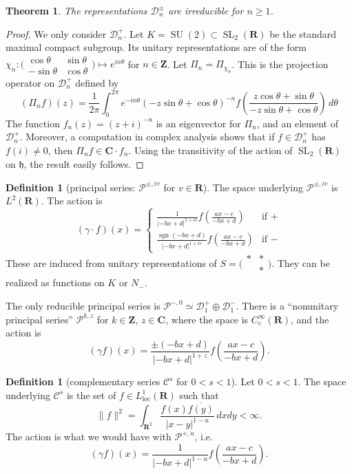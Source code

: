 \documentclass{article}
\DeclareMathOperator{\sign}{sgn}
\DeclareMathOperator{\speciallinear}{SL}
\DeclareMathOperator{\specialunitary}{SU}
\newcommand{\dC}{\mathbf{C}}
\newcommand{\dR}{\mathbf{R}}
\newcommand{\dZ}{\mathbf{Z}}
\newcommand{\fh}{\mathfrak{h}}
\newcommand{\complementaryseries}{\mathcal{C}}
\newcommand{\discreteseries}{\mathcal{D}}
\newcommand{\principalseries}{\mathcal{P}}
\newcommand{\smat}[4]{\bigl(\begin{smallmatrix} {#1} & {#2} \\ {#3} & {#4} \end{smallmatrix} \bigr)}
\newtheorem{theorem}[subsubsection]{Theorem}
\theoremstyle{definition}
\newtheorem{definition}[subsubsection]{Definition}
\begin{document}
\begin{theorem}
The representations $\discreteseries_n^\pm$ are irreducible for $n\geqslant 1$. 
\end{theorem}
\begin{proof}
We only consider $\discreteseries_n^+$. 
Let $K=\specialunitary(2)\subset \speciallinear_2(\dR)$ be the standard 
maximal compact subgroup. Its unitary representations are of the form 
$\chi_n:\smat{\cos\theta}{\sin\theta}{-\sin\theta}{\cos\theta}\mapsto e^{i n\theta}$ 
for $n\in \dZ$. Let $\Pi_n=\Pi_{\chi_n}$. This is the projection operator on 
$\discreteseries_n^+$ defined by 
\[
  (\Pi_n f)(z) = \frac{1}{2\pi} \int_0^{2\pi} e^{-i n \theta} (-z\sin\theta + \cos\theta)^{-n} f\left(\frac{z\cos\theta + \sin\theta}{-z\sin\theta + \cos\theta}\right)\, d\theta
\]
The function $f_n(z) = (z+i)^{-n}$ is an eigenvector for $\Pi_n$, and an element 
of $\discreteseries_n^+$. Moreover, a computation in complex analysis shows 
that if $f\in \discreteseries_n^+$ has $f(i)\ne 0$, then 
$\Pi_n f\in \dC\cdot f_n$. Using the transitivity of the action of 
$\speciallinear_2(\dR)$ on $\fh$, the result easily follows. 
\end{proof}


\begin{definition}[principal series: $\principalseries^{\pm, i v}$ for $v\in \dR$]
The space underlying $\principalseries^{\pm, i v}$ is $L^2(\dR)$. The action is 
\[
  (\gamma\cdot f)(x) = 
  \begin{cases}
    \frac{1}{|-b x+d|^{1+i v}} f\left(\frac{a x-c}{-b x+d}\right) & \text{if $+$} \\
    \frac{\sign(-b x+d)}{|-b x+d|^{1+i v}} f\left(\frac{a x-c}{-b x+d}\right) & \text{if $-$}
  \end{cases}
\]
These are induced from unitary representations of $S=\smat{\ast}{\ast}{}{\ast}$. 
They can be realized as functions on $K$ or $N_-$. 
\end{definition}

The only reducible principal series is 
$\principalseries^{-,0}\simeq \discreteseries_1^+ \oplus \discreteseries_1^-$. 
There is a ``nonunitary principal series'' $\principalseries^{k, z}$ for 
$k\in \dZ$, $z\in \dC$, where the space is $C_c^\infty(\dR)$, and the action 
is 
\[
  (\gamma f)(x) = \frac{\pm(-b x+d)}{|-b x+d|^{1+z}} f\left(\frac{a x-c}{-b x+d}\right) .
\]

\begin{definition}[complementary series $\complementaryseries^s$ for $0<s<1$]
Let $0<s<1$. The space underlying $\complementaryseries^s$ is the set of 
$f\in L_\text{loc}^1(\dR)$ such that 
\[
  \|f\|^2 = \int_{\dR^2} \frac{f(x)\overline{f(y)}}{|x-y|^{1-u}}\, dxdy <\infty .
\]
The action is what we would have with $\principalseries^{+, u}$, i.e. 
\[
  (\gamma f)(x) = \frac{1}{|-b x+d|^{1-u}} f\left(\frac{a x-c}{-b x+d}\right) .
\]
\end{definition}
\end{document}
